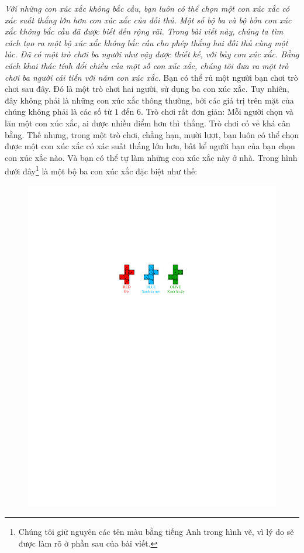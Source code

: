 \vspace*{202pt}

\begin{multicols}{2}
	\textit{Với những con xúc xắc không bắc cầu, bạn luôn có thể chọn một con xúc xắc có xác suất thắng lớn hơn con xúc xắc của đối thủ. Một số bộ ba và bộ bốn con xúc xắc không bắc cầu đã được biết đến rộng rãi. Trong bài viết này, chúng ta tìm cách tạo ra một bộ xúc xắc không bắc cầu cho phép thắng hai đối thủ cùng một lúc. Đã có một trò chơi ba người như vậy được thiết kế, với bảy con xúc xắc. Bằng cách khai thác tính đổi chiều của một số con xúc xắc, chúng tôi đưa ra một trò chơi ba người cải tiến với \linebreak năm con xúc xắc.}
	\vskip 0.05cm
	Bạn có thể rủ một người bạn chơi trò chơi sau đây. Đó là một trò chơi hai người, sử dụng ba con xúc xắc. Tuy nhiên, đây không phải là những con xúc xắc thông thường, bởi các giá trị trên mặt của chúng không phải là các số từ $1$ đến $6$.
	\vskip 0.05cm
	Trò chơi rất đơn giản: Mỗi người chọn và lăn một con xúc xắc, ai được nhiều điểm hơn thì~thắng.
	\vskip 0.05cm
	Trò chơi có vẻ khá cân bằng. Thế nhưng, trong một trò chơi, chẳng hạn, mười lượt, bạn luôn có thể chọn được một con xúc xắc có xác suất thắng lớn hơn, bất kể người bạn của bạn chọn con xúc xắc nào. Và bạn có thể tự làm những con xúc xắc này ở nhà.
	\vskip 0.05cm
	Trong hình dưới đây\footnote[2]{\color{quantoan}Chúng tôi giữ nguyên các tên màu bằng tiếng Anh trong hình vẽ, vì lý do sẽ được làm rõ ở phần sau của bài viết.} là một bộ ba con xúc xắc đặc biệt như thế:
	\begin{figure}[H]
		\vspace*{-5pt}
		\centering
		\captionsetup{labelformat= empty, justification=centering}
		\includegraphics[width= 0.8\linewidth]{1}

\end{figure}
\end{multicols}

